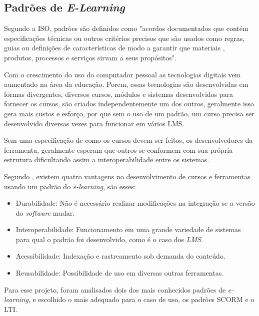 \subsection{Padrões de \textit{E-Learning}}
Segundo a ISO, padrões são definidos como "acordos documentados que contém especificações técnicas ou outros critérios precisos que são usados como regras, guias ou definições de características de modo a garantir que materiais , produtos, processos e serviços sirvam a seus propósitos".
\par
Com o crescimento do uso do computador pessoal as tecnologias digitais vem aumentado na área da educação. Porem, essas tecnologias são desenvolvidas em formas divergentes, diversos cursos, módulos e sistemas desenvolvidos para fornecer os cursos, são criados independentemente um dos outros, geralmente isso gera mais custos e esforço, por que sem o uso de um padrão, um curso precisa ser desenvolvido diversas vezes para funcionar em vários \ac{LMS}.
\par 
Sem uma especificação de como os cursos devem ser feitos, os desenvolvedores da ferramenta, geralmente esperam que outros se conformem com sua própria estrutura dificultando assim a interoperabilidade entre os sistemas.
\par
Segundo , existem quatro vantagens no desenvolvimento de cursos e ferramentas usando um padrão do \textit{e-learning}, são esses:
\begin{itemize}
  \item Durabilidade: Não é necessário realizar modificações na integração se a versão do \textit{software} mudar.
  \item Interoperabilidade: Funcionamento em uma grande variedade de sistemas para qual o padrão foi desenvolvido, como é o caso dos \textit{LMS}.
  \item Acessibilidade: Indexação e rastreamento sob demanda do conteúdo.
  \item Reusabilidade: Possibilidade de uso em diversas outras ferramentas.
\end{itemize}
\par
Para esse projeto, foram analisados dois dos mais conhecidos padrões de \textit{e-learning}, e escolhido o mais adequado para o caso de uso, os padrões \ac{SCORM} e o \ac{LTI}.

